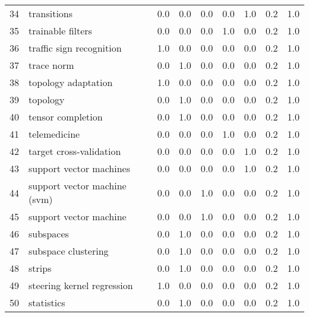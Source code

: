 \begin{tabular}{llrrrrrrr}
34 &                                     transitions &   0.0 &   0.0 &   0.0 &   0.0 &   1.0 &   0.2 &    1.0 \\
35 &                               trainable filters &   0.0 &   0.0 &   0.0 &   1.0 &   0.0 &   0.2 &    1.0 \\
36 &                        traffic sign recognition &   1.0 &   0.0 &   0.0 &   0.0 &   0.0 &   0.2 &    1.0 \\
37 &                                      trace norm &   0.0 &   1.0 &   0.0 &   0.0 &   0.0 &   0.2 &    1.0 \\
38 &                             topology adaptation &   1.0 &   0.0 &   0.0 &   0.0 &   0.0 &   0.2 &    1.0 \\
39 &                                        topology &   0.0 &   1.0 &   0.0 &   0.0 &   0.0 &   0.2 &    1.0 \\
40 &                               tensor completion &   0.0 &   1.0 &   0.0 &   0.0 &   0.0 &   0.2 &    1.0 \\
41 &                                    telemedicine &   0.0 &   0.0 &   0.0 &   1.0 &   0.0 &   0.2 &    1.0 \\
42 &                         target cross-validation &   0.0 &   0.0 &   0.0 &   0.0 &   1.0 &   0.2 &    1.0 \\
43 &                         support vector machines &   0.0 &   0.0 &   0.0 &   0.0 &   1.0 &   0.2 &    1.0 \\
44 &                    support vector machine (svm) &   0.0 &   0.0 &   1.0 &   0.0 &   0.0 &   0.2 &    1.0 \\
45 &                          support vector machine &   0.0 &   0.0 &   1.0 &   0.0 &   0.0 &   0.2 &    1.0 \\
46 &                                       subspaces &   0.0 &   1.0 &   0.0 &   0.0 &   0.0 &   0.2 &    1.0 \\
47 &                             subspace clustering &   0.0 &   1.0 &   0.0 &   0.0 &   0.0 &   0.2 &    1.0 \\
48 &                                          strips &   0.0 &   1.0 &   0.0 &   0.0 &   0.0 &   0.2 &    1.0 \\
49 &                      steering kernel regression &   1.0 &   0.0 &   0.0 &   0.0 &   0.0 &   0.2 &    1.0 \\
50 &                                      statistics &   0.0 &   1.0 &   0.0 &   0.0 &   0.0 &   0.2 &    1.0 \\

\end{tabular}
